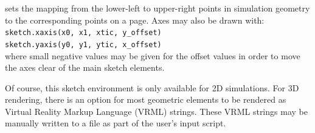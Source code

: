 \noindent
sets the mapping from the lower-left to upper-right points in simulation geometry 
to the corresponding points on a page.
Axes may also be drawn with:\\
\texttt{sketch.xaxis(x0, x1, xtic, y\_offset)} \\
\texttt{sketch.yaxis(y0, y1, ytic, x\_offset)} \\
where small negative values may be given for the offset values in order to move
the axes clear of the main sketch elements.

\medskip
Of course, this sketch environment is only available for 2D simulations.
For 3D rendering, there is an option for most geometric elements to be rendered as
Virtual Reality Markup Language (VRML) strings.  
These VRML strings may be manually written to a file as part of the user's input script.
